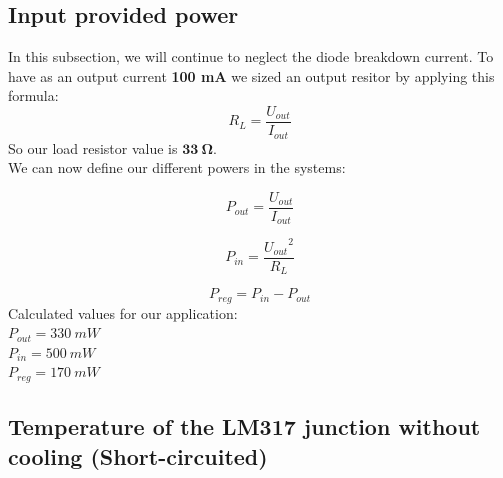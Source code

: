 \subsection{Input provided power} \label{ssec:num03}
{
In this subsection, we will continue to neglect the diode breakdown current. To have as an output current \textbf{100 mA} we sized an output resitor by applying this formula:
\begin{equation}
    R_L = \frac{U_{out}}{I_{out}}
\end{equation}
So our load resistor value is $ \mathbf{ 33 \ \boldsymbol{\Omega} } $. \\
\clearpage
We can now define our different powers in the systems:

\begin{equation}
    P_{out} = \frac{U_{out}}{I_{out}}
\end{equation}

\begin{equation}
    P_{in} = \frac{{U_{out}}^2}{R_{L}}
\end{equation}

\begin{equation}
    P_{reg} = P_{in} - P_{out}
\end{equation}
Calculated values for our application:\\
$ P_{out} = 330 \ mW $ \\
$ P_{in} = 500 \ mW $ \\
$ P_{reg} = 170 \ mW $ \\

}

\subsection{Temperature of the LM317 junction without cooling (Short-circuited)} \label{ssec:num05}
{

}

\clearpage
